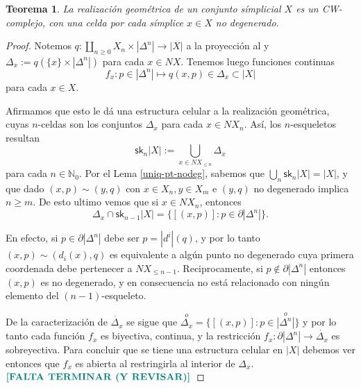 \documentclass[11pt]{report}
\theoremstyle{colored}
\newtheorem{theorem}{Teorema}[section]
\newcommand{\N}{\mathbb{N}}
\newcommand{\tint}[1]{\stackrel{o}{#1}}
\newcommand{\sk}{\mathsf{sk}}
\renewcommand{\ss}[1]{\Delta^{#1}}
\newcommand{\paint}[1]{\color{color}{#1}}
\newcommand{\tpaint}[1]{\paint{\textbf{#1}}}
\begin{document}
\begin{theorem} La realización geométrica de un conjunto símplicial $X$ es un CW-complejo, con una celda por cada símplice $x \in X$ no degenerado.
\end{theorem}

\begin{proof} Notemos $q : \coprod_{n \geq 0} X_n \times |\ss{n}| \to |X|$ a la proyección al y $\Delta_x := q(\{x\} \times |\ss{n}|)$ para cada $x \in NX$. Tenemos luego funciones continuas
\[
f_x : p \in |\ss{n}| \mapsto q(x,p) \in \Delta_x \subset |X|
\]
para cada $x \in X$. 

Afirmamos que esto le dá una estructura celular a la realización geométrica, cuyas $n$-celdas son los conjuntos $\Delta_x$ para cada $x \in NX_n$. Así, los $n$-esqueletos resultan
\[
\sk_n |X| := \bigcup_{x \in NX_{\leq n}}\Delta_x
\]
para cada $n \in \N_0$. Por el Lema \ref{uniq-pt-nodeg}, sabemos que $\bigcup_n \sk_n|X| = |X|$, y que dado $(x,p) \sim (y,q)$ con $x \in X_n, y \in X_m$ e $(y,q)$ no degenerado implica $n \geq m$. De esto ultimo vemos que si $x \in NX_n$, entonces
\[
\Delta_x \cap \sk_{n-1}|X| = \{[(x,p)] : p \in \partial|\ss{n}|\}.
\]

En efecto, si $p \in \partial|\ss{n}|$ debe ser $p = |d^i|(q)$, y por lo tanto $(x,p) \sim (d_i(x),q)$ es equivalente a algún punto no degenerado cuya primera coordenada debe pertenecer a $NX_{\leq n-1}$. Reciprocamente, si $p \not \in \partial|\ss{n}|$ entonces $(x,p)$ es no degenerado, y en consecuencia no está relacionado con ningún elemento del $(n-1)$-esqueleto.

De la caracterización de $\dot{\Delta_x}$ se sigue que $\tint{\Delta_x} = \{ [(x,p)] : p \in \tint{|\ss{n}|}\}$ y por lo tanto cada función $f_x$ es biyectiva, continua, y la restricción $f_x : \partial|\ss{n}| \to \dot{\Delta_x}$ es sobreyectiva. Para concluir que se tiene una estructura celular en $|X|$ debemos ver entonces que $f_x$ es abierta al restringirla al interior de $\Delta_x$.  $\tpaint{[FALTA TERMINAR (Y REVISAR)]}$
\end{proof}
\end{document}
